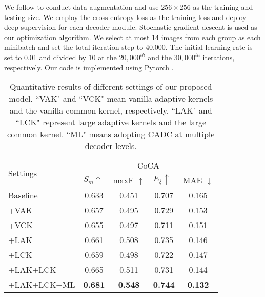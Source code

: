 \documentclass[10pt,twocolumn,letterpaper]{article}
\begin{document}
We follow \cite{liu2018picanet} to conduct data augmentation and use $256\times 256$ as the training and testing size.
We employ the cross-entropy loss as the training loss and deploy deep supervision for each decoder module.
Stochastic gradient descent is used as our optimization algorithm.
We select at most 14 images from each group as each minibatch and set the total iteration step to 40,000. The initial learning rate is set to 0.01 and divided by 10 at the $20,000^{th}$ and the $30,000^{th}$ iterations, respectively.
Our code is implemented using Pytorch \cite{paszke2019pytorch}.

\begin{table}[t]
\centering
\renewcommand{\arraystretch}{1.0}
\renewcommand{\tabcolsep}{2.8mm}
\footnotesize
\caption{Quantitative results of different settings of our proposed model. ``VAK" and ``VCK" mean vanilla adaptive kernels and the vanilla common kernel, respectively. ``LAK" and ``LCK" represent large adaptive kernels and the large common kernel. ``ML" means adopting CADC at multiple decoder levels.}

\begin{tabular}{l|l|cccc}
\hline
\multicolumn{2}{l|}{\multirow{2}{*}{Settings}} & \multicolumn{4}{c}{CoCA} \\
\multicolumn{2}{l|}{}                      & \multicolumn{1}{l}{$S_m \uparrow$} & \multicolumn{1}{l}{maxF $\uparrow$} & \multicolumn{1}{l}{$E_\xi \uparrow$} & \multicolumn{1}{l}{MAE $\downarrow$}   \\ \hline

\multicolumn{2}{l|}{Baseline}  &0.633 &0.451 &0.707	&0.165  \\ \hline
\multicolumn{2}{l|}{+VAK}      &0.657 &0.495 &0.729	&0.153  \\
\multicolumn{2}{l|}{+VCK}      &0.655 &0.497 &0.711	&0.151   \\
\multicolumn{2}{l|}{+LAK}      &0.661 &0.508 &0.735	&0.146    \\
\multicolumn{2}{l|}{+LCK}      &0.659 &0.498 &0.722	&0.147\\
\multicolumn{2}{l|}{+LAK+LCK}  &0.665 &0.511 &0.731	&0.144  \\ \hline
\multicolumn{2}{l|}{+LAK+LCK+ML} &\textbf{0.681} &\textbf{0.548} &\textbf{0.744} &\textbf{0.132}\\ \hline
\end{tabular}
\label{kernel_ablation}
\end{table}
\end{document}
